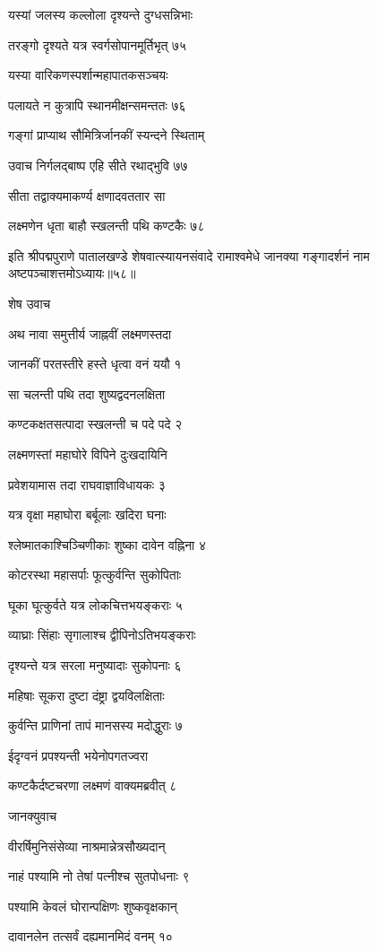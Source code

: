 यस्यां जलस्य कल्लोला दृश्यन्ते दुग्धसन्निभाः

तरङ्गो दृश्यते यत्र स्वर्गसोपानमूर्तिभृत् ७५

यस्या वारिकणस्पर्शान्महापातकसञ्चयः

पलायते न कुत्रापि स्थानमीक्षन्समन्ततः ७६

गङ्गां प्राप्याथ सौमित्रिर्जानकीं स्यन्दने स्थिताम्

उवाच निर्गलद्बाष्प एहि सीते रथाद्भुवि ७७

सीता तद्वाक्यमाकर्ण्य क्षणादवततार सा

लक्ष्मणेन धृता बाहौ स्खलन्ती पथि कण्टकैः ७८

इति श्रीपद्मपुराणे पातालखण्डे शेषवात्स्यायनसंवादे रामाश्वमेधे जानक्या गङ्गादर्शनं नाम अष्टपञ्चाशत्तमोऽध्यायः॥५८॥


शेष उवाच

अथ नावा समुत्तीर्य जाह्नवीं लक्ष्मणस्तदा

जानकीं परतस्तीरे हस्ते धृत्वा वनं ययौ १

सा चलन्ती पथि तदा शुष्यद्वदनलक्षिता

कण्टकक्षतसत्पादा स्खलन्ती च पदे पदे २

लक्ष्मणस्तां महाघोरे विपिने दुःखदायिनि

प्रवेशयामास तदा राघवाज्ञाविधायकः ३

यत्र वृक्षा महाघोरा बर्बूलाः खदिरा घनाः

श्लेष्मातकाश्चिञ्चिणीकाः शुष्का दावेन वह्निना ४

कोटरस्था महासर्पाः फूत्कुर्वन्ति सुकोपिताः

घूका घूत्कुर्वते यत्र लोकचित्तभयङ्कराः ५

व्याघ्राः सिंहाः सृगालाश्च द्वीपिनोऽतिभयङ्कराः

दृश्यन्ते यत्र सरला मनुष्यादाः सुकोपनाः ६

महिषाः सूकरा दुष्टा दंष्ट्रा द्वयविलक्षिताः

कुर्वन्ति प्राणिनां तापं मानसस्य मदोद्धुराः ७

ईदृग्वनं प्रपश्यन्ती भयेनोपगतज्वरा

कण्टकैर्दष्टचरणा लक्ष्मणं वाक्यमब्रवीत् ८

जानक्युवाच

वीरर्षिमुनिसंसेव्या नाश्रमान्नेत्रसौख्यदान्

नाहं पश्यामि नो तेषां पत्नीश्च सुतपोधनाः ९

पश्यामि केवलं घोरान्पक्षिणः शुष्कवृक्षकान्

दावानलेन तत्सर्वं दह्यमानमिदं वनम् १०

